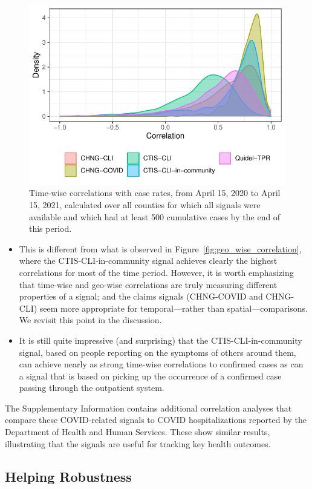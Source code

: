 \documentclass[11pt]{article}
\begin{document}
\begin{figure}[t]
  \centering
  \includegraphics[width=0.6\columnwidth]{fig/time_wise_correlation.pdf}
  \caption{Time-wise correlations with case rates, from April 15, 2020 to April
    15, 2021, calculated over all counties for which all signals were available
    and which had at least 500 cumulative cases by the end of this period.}
  \label{fig:time_wise_correlation}
\end{figure}

\begin{itemize}
\item This is different from what is observed in
  Figure~\ref{fig:geo_wise_correlation}, where the CTIS-CLI-in-community signal
  achieves clearly the highest correlations for most of the time period.
  However, it is worth emphasizing that time-wise and geo-wise
  correlations are truly measuring different properties of a signal; and the
  claims signals (CHNG-COVID and CHNG-CLI) seem more appropriate for
  temporal---rather than spatial---comparisons.  We revisit this point in the
  discussion.

\item It is still quite impressive (and surprising) that the
  CTIS-CLI-in-community signal, based on people reporting on the symptoms of
  others around them, can achieve  nearly as strong time-wise correlations to
  confirmed cases as can a signal that is based on picking up the occurrence of
  a confirmed case passing through the outpatient system.
\end{itemize}
The Supplementary Information contains additional correlation analyses that
compare these COVID-related signals to COVID hospitalizations reported by the
Department of Health and Human Services. These show similar results,
illustrating that the signals are useful for tracking key health outcomes.

\subsection{Helping Robustness}
\end{document}
